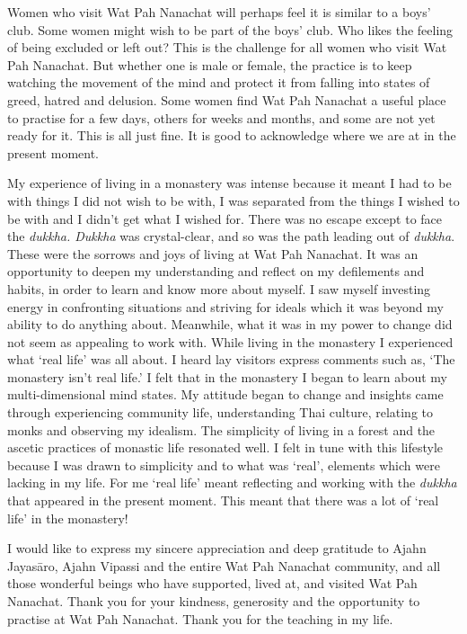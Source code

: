 Women who visit Wat Pah Nanachat will perhaps feel it is similar to a
boys' club. Some women might wish to be part of the boys' club. Who
likes the feeling of being excluded or left out? This is the challenge
for all women who visit Wat Pah Nanachat. But whether one is male or
female, the practice is to keep watching the movement of the mind and
protect it from falling into states of greed, hatred and delusion. Some
women find Wat Pah Nanachat a useful place to practise for a few days, 
others for weeks and months, and some are not yet ready for it. This is
all just fine. It is good to acknowledge where we are at in the present
moment. 

My experience of living in a monastery was intense because it meant I
had to be with things I did not wish to be with, I was separated from
the things I wished to be with and I didn't get what I wished for. There
was no escape except to face the \emph{dukkha. Dukkha} was
crystal-clear, and so was the path leading out of \emph{dukkha}. These
were the sorrows and joys of living at Wat Pah Nanachat. It was an
opportunity to deepen my understanding and reflect on my defilements and
habits, in order to learn and know more about myself. I saw myself
investing energy in confronting situations and striving for ideals which
it was beyond my ability to do anything about. Meanwhile, what it was in
my power to change did not seem as appealing to work with. While living
in the monastery I experienced what `real life' was all about. I heard
lay visitors express comments such as, `The monastery isn't real life.'
I felt that in the monastery I began to learn about my multi-dimensional
mind states. My attitude began to change and insights came through
experiencing community life, understanding Thai culture, relating to
monks and observing my idealism. The simplicity of living in a forest
and the ascetic practices of monastic life resonated well. I felt in
tune with this lifestyle because I was drawn to simplicity and to what
was `real', elements which were lacking in my life. For me `real life'
meant reflecting and working with the \emph{dukkha} that appeared in the
present moment. This meant that there was a lot of `real life' in the
monastery! 

I would like to express my sincere appreciation and deep gratitude to
Ajahn Jayasāro, Ajahn Vipassi and the entire Wat Pah Nanachat community, 
and all those wonderful beings who have supported, lived at, and visited
Wat Pah Nanachat. Thank you for your kindness, generosity and the
opportunity to practise at Wat Pah Nanachat. Thank you for the teaching
in my life. 

